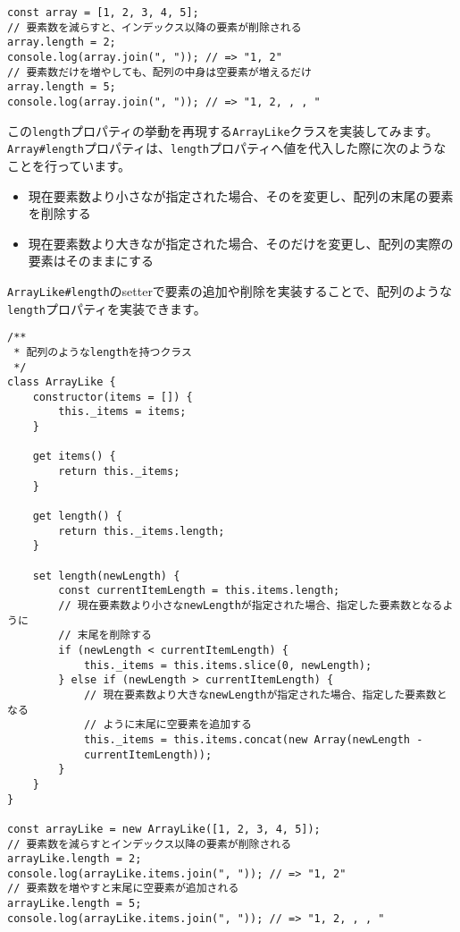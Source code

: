 \begin{lstlisting}
const array = [1, 2, 3, 4, 5];
// 要素数を減らすと、インデックス以降の要素が削除される
array.length = 2;
console.log(array.join(", ")); // => "1, 2"
// 要素数だけを増やしても、配列の中身は空要素が増えるだけ
array.length = 5;
console.log(array.join(", ")); // => "1, 2, , , "
\end{lstlisting}

この\texttt{length}プロパティの挙動を再現する\texttt{ArrayLike}クラスを実装してみます。
\texttt{Array\#length}プロパティは、\texttt{length}プロパティへ値を代入した際に次のようなことを行っています。

\begin{itemize}
\item
  現在要素数より小さな\textbf{}が指定された場合、その\textbf{}を変更し、配列の末尾の要素を削除する
\item
  現在要素数より大きな\textbf{}が指定された場合、その\textbf{}だけを変更し、配列の実際の要素はそのままにする
\end{itemize}

\texttt{ArrayLike\#length}のsetterで要素の追加や削除を実装することで、配列のような\texttt{length}プロパティを実装できます。

\begin{lstlisting}
/**
 * 配列のようなlengthを持つクラス
 */
class ArrayLike {
    constructor(items = []) {
        this._items = items;
    }

    get items() {
        return this._items;
    }

    get length() {
        return this._items.length;
    }

    set length(newLength) {
        const currentItemLength = this.items.length;
        // 現在要素数より小さなnewLengthが指定された場合、指定した要素数となるように
        // 末尾を削除する
        if (newLength < currentItemLength) {
            this._items = this.items.slice(0, newLength);
        } else if (newLength > currentItemLength) {
            // 現在要素数より大きなnewLengthが指定された場合、指定した要素数となる
            // ように末尾に空要素を追加する
            this._items = this.items.concat(new Array(newLength - 
            currentItemLength));
        }
    }
}

const arrayLike = new ArrayLike([1, 2, 3, 4, 5]);
// 要素数を減らすとインデックス以降の要素が削除される
arrayLike.length = 2;
console.log(arrayLike.items.join(", ")); // => "1, 2"
// 要素数を増やすと末尾に空要素が追加される
arrayLike.length = 5;
console.log(arrayLike.items.join(", ")); // => "1, 2, , , "
\end{lstlisting}

